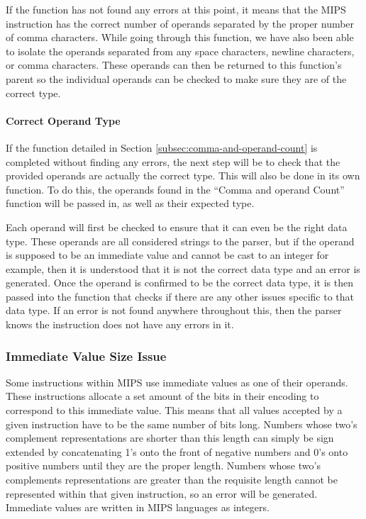 \documentclass[
    paper=letter,
    parskip=half,
    fontsize=12pt,
    titlepage=firstiscover,
    toc=bibliography,
    numbers=endperiod
]{scrartcl}
\begin{document}
If the function has not found any errors at this point, it means that
the MIPS instruction has the correct number of operands separated by the
proper number of comma characters. While going through this function, we
have also been able to isolate the operands separated from any space
characters, newline characters, or comma characters. These operands can
then be returned to this function's parent so the individual operands
can be checked to make sure they are of the correct type.

\paragraph{Correct Operand Type}

If the function detailed in Section \ref{subsec:comma-and-operand-count}
is completed without finding any errors, the next step will be to check
that the provided operands are actually the correct type. This will also
be done in its own function. To do this, the operands found in the
``Comma and operand Count'' function will be passed in, as well as their
expected type.

Each operand will first be checked to ensure that it can even be the
right data type. These operands are all considered strings to the
parser, but if the operand is supposed to be an immediate value and
cannot be cast to an integer for example, then it is understood that it
is not the correct data type and an error is generated. Once the operand
is confirmed to be the correct data type, it is then passed into the
function that checks if there are any other issues specific to that data
type. If an error is not found anywhere throughout this, then the parser
knows the instruction does not have any errors in it.

\subsubsection{Immediate Value Size Issue}

Some instructions within MIPS use immediate values as one of their
operands. These instructions allocate a set amount of the bits in their
encoding to correspond to this immediate value. This means that all
values accepted by a given instruction have to be the same number of
bits long. Numbers whose two's complement representations are shorter
than this length can simply be sign extended by concatenating 1's onto
the front of negative numbers and 0's onto positive numbers until they
are the proper length. Numbers whose two's complements representations
are greater than the requisite length cannot be represented within that
given instruction, so an error will be generated. Immediate values are
written in MIPS languages as integers.
\end{document}
